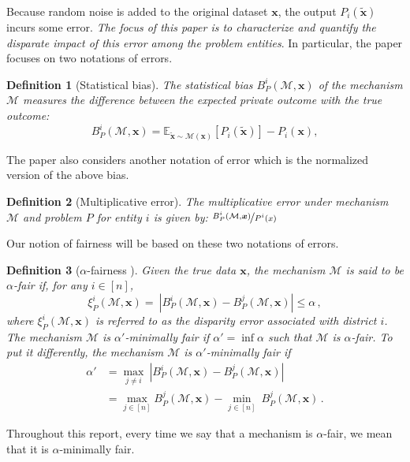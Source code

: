 \documentclass[9pt,twocolumn,twoside,lineno]{pnas-new}
\newtheorem{definition}{Definition}
\newcommand{\cM}{\mathcal{M}}
\newcommand{\EE}{\mathbb{E}} \newcommand{\RR}{\mathbb{R}}
\newcommand{\truedata}{\bm{x}}
\begin{document}
Because random noise is added to the original dataset $\bm{x}$, the output $P_i(\tilde{\bm{x}})$ incurs some error. {\em The focus of this paper is to characterize and quantify the disparate impact of this error among the problem entities}. In particular, the paper focuses on two notations of errors. 

\begin{definition}[Statistical bias]
\label{def:bias}
The statistical bias  $ B_P^i(\cM, \bm{x}) $ of the mechanism $\cM$ measures the difference between the expected private outcome with the true outcome: 
 \begin{equation}
 \label{eq:bias}
  B_P^i(\cM, \bm{x}) = 
  \EE_{\tilde{\bm{x}} \sim \cM(\bm{x})} \left[ P_i(\tilde{\bm{x}}) \right] - P_i (\bm{x}),
   \end{equation}

\end{definition}

The paper also considers another notation of error which is the normalized version of the above bias.
\begin{definition}[Multiplicative error]
The multiplicative error under mechanism $\cM$ and problem $P$ for entity $i$ is given by: $\nicefrac{B_P^i(\cM, \bm{x})}{P^i(x)}$

\end{definition}

Our notion of fairness will be based on these two notations of errors. 


\begin{definition}[$\alpha$-fairness \cite{fioretto2021decision}]
        Given the true data $\truedata$, the mechanism $\cM$ is said to be \emph{$\alpha$-fair} if, for any $i\in[n]$,
        \begin{equation*}
            \xi^{i}_P(\cM, \bm{x}) = ~\left\vert  B_P^i(\cM, \bm{x}) - B_P^j(\cM, \bm{x}) 
             \right\vert\leq \alpha\,,
        \end{equation*}
        where $ \xi^{i}_P(\cM, \bm{x})$ is referred to as the \emph{disparity error} associated with 
        district $i$. The mechanism $\cM$ is \emph{$\alpha'$-minimally fair} if $\alpha'=\inf \alpha$ such that
        $\cM$ is $\alpha$-fair. To put it differently, the mechanism $\cM$ is \emph{$\alpha'$-minimally fair} if 
        \begin{align*}
            \alpha'& = \max_{j\neq i}~\left\vert  B_P^i(\cM, \bm{x}) - B_P^j(\cM, \bm{x}) 
             \right\vert \\
             &= \max_{j\in [n]} B_P^j(\cM, \bm{x})   -\min_{j\in [n]}~  B_P^j(\cM, \bm{x}) \,.
        \end{align*}
    \end{definition}
    Throughout this report, every time we say that a mechanism is $\alpha$-fair, we mean that
    it is $\alpha$-minimally fair.
\end{document}
